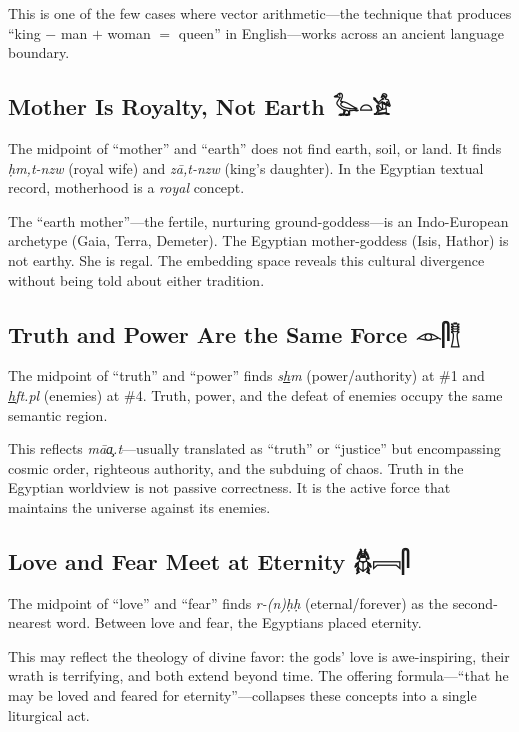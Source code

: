\documentclass[11pt, a4paper]{article}
\newcommand{\hiero}[1]{{\normalfont\hierofont #1}}
\begin{document}
This is one of the few cases where vector arithmetic---the technique that produces ``king $-$ man $+$ woman $=$ queen'' in English---works across an ancient language boundary.

\subsection{Mother Is Royalty, Not Earth \hfill \hiero{𓅭𓏏𓀀}}

The midpoint of ``mother'' and ``earth'' does not find earth, soil, or land. It finds \textit{\d{h}m,t-nzw} (royal wife) and \textit{z\=a,t-nzw} (king's daughter). In the Egyptian textual record, motherhood is a \textit{royal} concept.

The ``earth mother''---the fertile, nurturing ground-goddess---is an Indo-European archetype (Gaia, Terra, Demeter). The Egyptian mother-goddess (Isis, Hathor) is not earthy. She is regal. The embedding space reveals this cultural divergence without being told about either tradition.

\subsection{Truth and Power Are the Same Force \hfill \hiero{𓁹𓋴𓊽}}

The midpoint of ``truth'' and ``power'' finds \textit{s\underline{h}m} (power/authority) at \#1 and \textit{\underline{h}ft.pl} (enemies) at \#4. Truth, power, and the defeat of enemies occupy the same semantic region.

This reflects \textit{m\=a\c{a}.t}---usually translated as ``truth'' or ``justice'' but encompassing cosmic order, righteous authority, and the subduing of chaos. Truth in the Egyptian worldview is not passive correctness. It is the active force that maintains the universe against its enemies.

\subsection{Love and Fear Meet at Eternity \hfill \hiero{𓆣𓇯𓋴}}

The midpoint of ``love'' and ``fear'' finds \textit{r-(n)\d{h}\d{h}} (eternal/forever) as the second-nearest word. Between love and fear, the Egyptians placed eternity.

This may reflect the theology of divine favor: the gods' love is awe-inspiring, their wrath is terrifying, and both extend beyond time. The offering formula---``that he may be loved and feared for eternity''---collapses these concepts into a single liturgical act.
\end{document}
